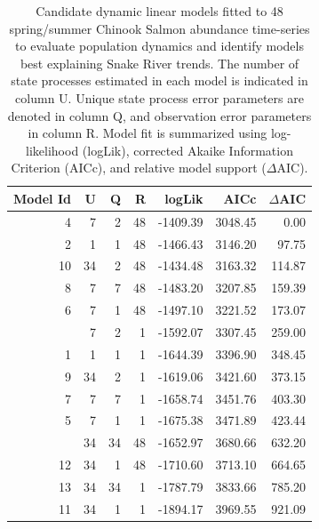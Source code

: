 \documentclass[12pt,a4paper]{article}
\begin{document}
\begin{table}

\caption{Candidate dynamic linear models fitted to 48 spring/summer Chinook Salmon abundance time-series to evaluate population dynamics and identify models best explaining Snake River trends. The number of state processes estimated in each model is indicated in column U. Unique state process error parameters are denoted in column Q, and observation error parameters in column R. Model fit is summarized using log-likelihood (logLik), corrected Akaike Information Criterion (AICc), and relative model support ($\Delta$AIC).}
\centering
\begin{tabular}[t]{rrrrrrr}
\toprule
Model Id & U & Q & R & logLik & AICc & $\Delta$AIC\\
\midrule
4 & 7 & 2 & 48 & -1409.39 & 3048.45 & 0.00\\
2 & 1 & 1 & 48 & -1466.43 & 3146.20 & 97.75\\
10 & 34 & 2 & 48 & -1434.48 & 3163.32 & 114.87\\
8 & 7 & 7 & 48 & -1483.20 & 3207.85 & 159.39\\
6 & 7 & 1 & 48 & -1497.10 & 3221.52 & 173.07\\
\addlinespace
3 & 7 & 2 & 1 & -1592.07 & 3307.45 & 259.00\\
1 & 1 & 1 & 1 & -1644.39 & 3396.90 & 348.45\\
9 & 34 & 2 & 1 & -1619.06 & 3421.60 & 373.15\\
7 & 7 & 7 & 1 & -1658.74 & 3451.76 & 403.30\\
5 & 7 & 1 & 1 & -1675.38 & 3471.89 & 423.44\\
\addlinespace
14 & 34 & 34 & 48 & -1652.97 & 3680.66 & 632.20\\
12 & 34 & 1 & 48 & -1710.60 & 3713.10 & 664.65\\
13 & 34 & 34 & 1 & -1787.79 & 3833.66 & 785.20\\
11 & 34 & 1 & 1 & -1894.17 & 3969.55 & 921.09\\
\bottomrule
\end{tabular}
\end{table}
\end{document}
